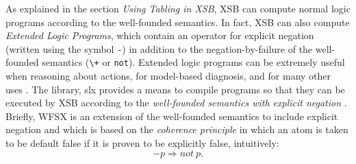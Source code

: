 As explained in the section {\it Using Tabling in XSB}, XSB can
compute normal logic programs according to the well-founded semantics.
In fact, XSB can also compute {\em Extended Logic Programs}, which
contain an operator for explicit negation (written using the symbol
{\tt -}) in addition to the negation-by-failure of the well-founded
semantics (\verb|\+| or {\tt not}).  Extended logic programs can be
extremely useful when reasoning about actions, for model-based
diagnosis, and for many other uses \cite{AlPe95}.  The library, {\sf
slx} provides a means to compile programs so that they can be executed
by XSB according to the {\em well-founded semantics with explicit
negation} \cite{ADP95}.  Briefly, WFSX is an extension of the
well-founded semantics to include explicit negation and which is based
on the {\em coherence principle} in which an atom is taken to be
default false if it is proven to be explicitly false, intuitively:
\[
-p \Rightarrow not\ p.
\]


